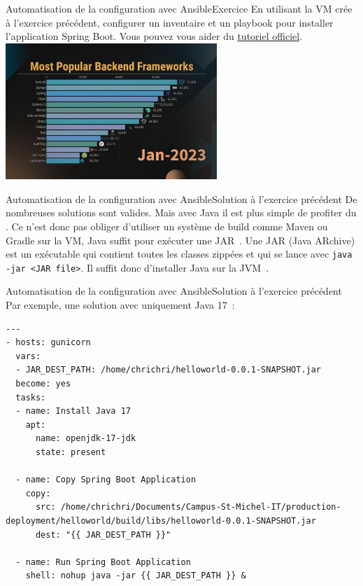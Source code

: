 \documentclass{beamer}
\begin{document}
    \begin{frame}{Automatisation de la configuration avec Ansible}{Exercice \execcounterdispinc{}}
        En utilisant la VM crée à l'exercice précédent, configurer un inventaire et un playbook pour installer l'application Spring Boot.
        \bigbreak
        Vous pouvez vous aider du \href{https://spring.io/guides/gs/spring-boot}{tutoriel officiel}.
        \bigbreak
        \centering
        \includegraphics[width=8cm]{image/most-popular-backend}
    \end{frame}

    \begin{frame}{Automatisation de la configuration avec Ansible}{Solution à l'exercice précédent}
        De nombreuses solutions sont valides.
        Mais avec Java il est plus simple de profiter du .
        \bigbreak
        Ce n'est donc pas obliger d'utiliser un système de build comme Maven ou Gradle sur la VM, Java suffit pour exécuter une JAR~.
        \bigbreak
        Une JAR (Java ARchive) est un exécutable qui contient toutes les classes zippées et qui se lance avec \lstinline{java -jar <JAR file>}.
        Il suffit donc d'installer Java sur la JVM~.
    \end{frame}

    \begin{frame}[fragile]{Automatisation de la configuration avec Ansible}{Solution à l'exercice précédent}
        Par exemple, une solution avec uniquement Java 17~:
        \begin{lstlisting}[basicstyle=\ttfamily\tiny]
---
- hosts: gunicorn
  vars:
  - JAR_DEST_PATH: /home/chrichri/helloworld-0.0.1-SNAPSHOT.jar
  become: yes
  tasks:
  - name: Install Java 17
    apt:
      name: openjdk-17-jdk
      state: present

  - name: Copy Spring Boot Application
    copy:
      src: /home/chrichri/Documents/Campus-St-Michel-IT/production-deployment/helloworld/build/libs/helloworld-0.0.1-SNAPSHOT.jar
      dest: "{{ JAR_DEST_PATH }}"

  - name: Run Spring Boot Application
    shell: nohup java -jar {{ JAR_DEST_PATH }} &
        \end{lstlisting}
    \end{frame}
\end{document}
